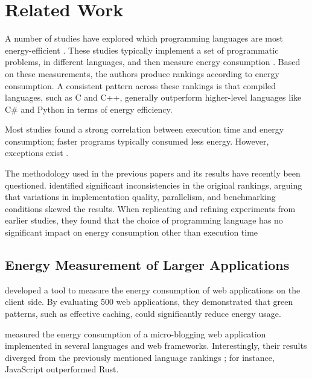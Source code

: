 \documentclass[main.tex]{subfiles}
\begin{document}
\section{Related Work}

A number of studies have explored which programming languages are most energy-efficient \cite{pereira2017energy, Pereira_Couto_Ribeiro_Rua_Cunha_Fernandes_Saraiva_2021, Couto_Pereira_Ribeiro_Rua_Saraiva_2017, Gordillo_Calero_Moraga_García_Fernandes_Abreu_Saraiva_2024}. These studies typically implement a set of programmatic problems, in different languages, and then measure energy consumption \cite[Table 1]{pereira2017energy}. Based on these measurements, the authors produce rankings according to energy consumption. A consistent pattern across these rankings is that compiled languages, such as C and C++, generally outperform higher-level languages like C\# and Python in terms of energy efficiency. 

Most studies found a strong correlation between execution time and energy consumption; faster programs typically consumed less energy. However, exceptions exist \cite[Table 7]{Couto_Pereira_Ribeiro_Rua_Saraiva_2017}. 

The methodology used in the previous papers and its results have recently been questioned. \textcite{Kempen_Kwon_Nguyen_Berger_2024} identified significant inconsistencies in the original rankings, arguing that variations in implementation quality, parallelism, and benchmarking conditions skewed the results. When replicating and refining experiments from earlier studies, they found that the choice of programming language has no significant impact on energy consumption other than execution time \cite{Kempen_Kwon_Nguyen_Berger_2024}

\subsection{Energy Measurement of Larger Applications}

\textcite{Philippot_Anglade_Leboucq_2014} developed a tool to measure the energy consumption of web applications on the client side. By evaluating 500 web applications, they demonstrated that green patterns, such as effective caching, could significantly reduce energy usage.

\textcite{Pfeiffer_Trindade_Meding_Harwick} measured the energy consumption of a micro-blogging web application implemented in several languages and web frameworks. Interestingly, their results diverged from the previously mentioned language rankings \cite{pereira2017energy, Pereira_Couto_Ribeiro_Rua_Cunha_Fernandes_Saraiva_2021, Couto_Pereira_Ribeiro_Rua_Saraiva_2017, Gordillo_Calero_Moraga_García_Fernandes_Abreu_Saraiva_2024}; for instance, JavaScript outperformed Rust.
\end{document}
